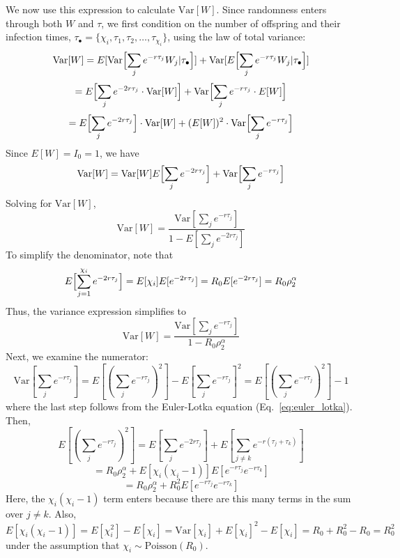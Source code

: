 We now use this expression to calculate $\text{Var}[W]$. Since randomness enters through both $W$ and $\tau$, we first condition on the number of offspring and their infection times, $\tau_\bullet = \{ \chi_i, \tau_1, \tau_2, \dots, \tau_{\chi_i} \}$, using the law of total variance: 
%
\[ \text{Var}[W] = E[\text{Var}\Bigl[\sum_j e^{-r \tau_j} W_j | \tau_\bullet\Bigr]] + \text{Var}[E\Bigl[\sum_j e^{-r \tau_j} W_j | \tau_\bullet\Bigr]] \]
\[
=E\Bigl[ \sum_j e^{-2r\tau_j}  \cdot \text{Var}[W] \Bigr] + 
\text{Var} \Bigl[\sum_j e^{-r \tau_j} \cdot E[W] \Bigr]
\]
\[
= E\Bigl[\sum_j e^{-2 r \tau_j}\Bigr] \cdot \text{Var}[W] + 
(E[W])^2 \cdot \text{Var}\Bigl[\sum_j e^{-r \tau_j}\Bigr]
\]
%
Since $E[W] = I_0 = 1$, we have 
\[
	\text{Var}[W] = \text{Var}[W] E\Bigl[\sum_j e^{-2 r \tau_j}\Bigr] + \text{Var}\Bigl[\sum_j e^{-r \tau_j}\Bigr]
\]
Solving for $\text{Var}[W]$, 
\[
	\text{Var}[W] = \frac{\text{Var}[\sum_j e^{-r \tau_j}]}{1 - E[\sum_j e^{-2 r \tau_j}]}
\]
To simplify the denominator, note that 
\[ 
E\Bigl[\sum_{j=1}^{\chi_i} e^{-2 r \tau_j}\Bigr] = E[\chi_i] E[e^{-2 r \tau_j}]
 = R_0 E[e^{-2 r \tau_j}]
 = R_0 \rho_2^\alpha 
 \]
Thus, the variance expression simplifies to 
\[
	\text{Var}[W] = \frac{\text{Var}[\sum_j e^{-r \tau_j}]}{1 - R_0 \rho_2^\alpha}
\]
Next, we examine the numerator: 
\[
	\text{Var}[\sum_j e^{-r \tau_j}] = E[(\sum_j e^{-r \tau_j})^2] - E[\sum_j e^{-r \tau_j}]^2 = E[(\sum_j e^{-r \tau_j})^2] - 1
\]
where the last step follows from the Euler-Lotka equation (Eq.~\ref{eq:euler_lotka}). 
Then, 
\[
	E[(\sum_j e^{- r \tau_j})^2] = E[\sum_j e^{-2 r \tau_j}] + E[\sum_{j \neq k} e^{-r (\tau_j + \tau_k)}]
\]
\[= R_0 \rho_2^\alpha + E[\chi_i (\chi_i - 1)] E[e^{-r \tau_j} e^{-r \tau_k}]\]
\[= R_0 \rho_2^\alpha + R_0^2 E[e^{-r \tau_j} e^{-r \tau_k}]\]
Here, the $\chi_i (\chi_i - 1)$ term enters because there are this many terms in the sum over $j \neq k$. Also, 
\[
E[\chi_i (\chi_i - 1)] = E[\chi_i^2] - E[\chi_i] = \text{Var}[\chi_i] + E[\chi_i]^2 - E[\chi_i] = R_0 + R_0^2 - R_0 = R_0^2
\]
under the assumption that $\chi_i \sim \text{Poisson}(R_0)$. 

